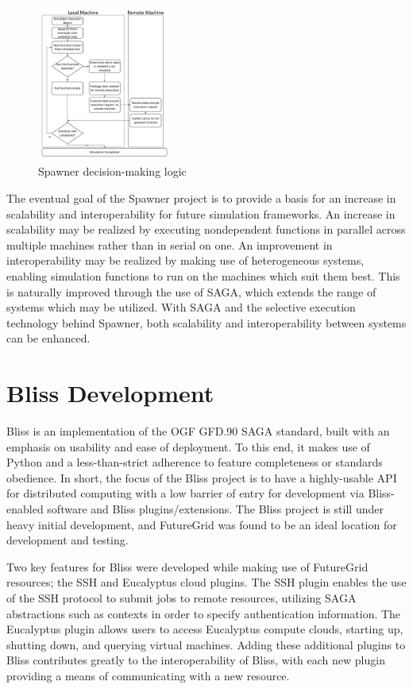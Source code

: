 \documentclass[]{paper}
\begin{document}
\begin{figure}[t]
	\centering
		\includegraphics[width=0.40\textwidth]{figures/spawner-logic.pdf}
\caption{Spawner decision-making logic}
\label{fig:spawner}
\end{figure}		

The eventual goal of the Spawner project is to provide a basis for an increase in
scalability and interoperability for future simulation frameworks.  An increase in scalability
may be realized by executing nondependent functions in parallel across multiple machines rather
than in serial on one.  An improvement in interoperability may be realized by making use of heterogeneous systems,
enabling simulation functions to run on the machines which suit them best.  This is naturally improved through
the use of SAGA, which extends the range of systems which may be utilized.  With SAGA and the
selective execution technology behind Spawner, both scalability and interoperability between systems
can be enhanced.

\section{Bliss Development}
Bliss is an implementation of the OGF GFD.90 SAGA standard, built with an emphasis
on usability and ease of deployment.  To this end, it makes use of Python and a
less-than-strict adherence to feature completeness or standards obedience.
In short, the focus of the Bliss project is to have a highly-usable API for distributed
computing with a low barrier of entry for development via Bliss-enabled software
and Bliss plugins/extensions.  The Bliss project is still under heavy 
initial development, and FutureGrid was found to be an ideal location for development and testing.

Two key features for Bliss were developed while making use of FutureGrid resources; 
the SSH and Eucalyptus cloud plugins.  The SSH plugin enables the use of the SSH protocol
to submit jobs to remote resources, utilizing SAGA abstractions such as contexts in order
to specify authentication information.  The Eucalyptus plugin allows users to access
Eucalyptus compute clouds, starting up, shutting down, and querying virtual machines.
Adding these additional plugins to Bliss contributes greatly to the interoperability of
Bliss, with each new plugin providing a means of communicating with a new resource.
\end{document}
